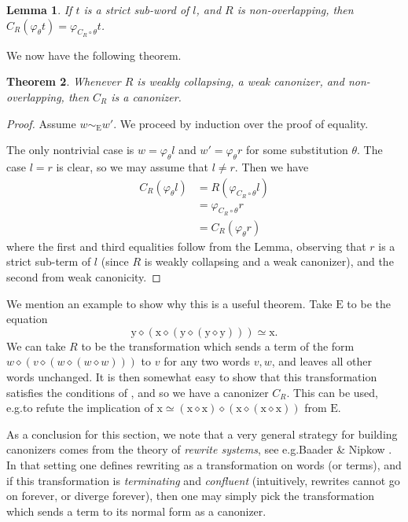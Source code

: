 \documentclass[12pt]{amsart}
\newtheorem{theorem}{Theorem}[section]
\newtheorem{lemma}[theorem]{Lemma}
\theoremstyle{definition}
\newcommand{\x}{\mathrm{x}}
\newcommand{\y}{\mathrm{y}}
\newcommand{\op}{\diamond}
\newcommand{\formaleq}{\simeq}
\newcommand{\E}{\mathrm{E}}
\begin{document}
\begin{lemma}\label{lem:subsubst}
  If $t$ is a strict sub-word of $l$, and $R$ is non-overlapping, then $C_R(\varphi_\theta t) = \varphi_{C_R\circ \theta} t$.
\end{lemma}
We now have the following theorem.
\begin{theorem}\label{thm:canon}
  Whenever $R$ is weakly collapsing, a weak canonizer, and non-overlapping, then $C_R$ is a canonizer.
\end{theorem}
\begin{proof}
  Assume $w\sim_{\E}w'$. We proceed by induction over the proof of equality.

  The only nontrivial case is $w = \varphi_\theta l$ and $w'=\varphi_\theta r$ for some substitution $\theta$.  The case $l=r$ is clear, so we may assume that $l \neq r$.
  Then we have
  \begin{align*}
    C_R(\varphi_\theta l) &= R(\varphi_{C_R\circ\theta}l) \\
                 &= \varphi_{C_R\circ\theta}r\\
                 &= C_R(\varphi_\theta r)
  \end{align*}
  where the first and third equalities follow from the Lemma, observing that $r$ is a strict sub-term of $l$ (since $R$ is weakly collapsing and a weak canonizer), and the second from weak canonicity.
\end{proof}

We mention an example to show why this is a useful theorem. Take $\E$ to be the equation
\[
  \y \op (\x \op (\y \op (\y \op \y)))\formaleq \x.
\]
We can take $R$ to be the transformation which sends a term of the form $w \op (v \op (w \op (w \op w)))$ to $v$ for any two words $v, w$, and leaves all other words unchanged.
It is then somewhat easy to show that this transformation satisfies the conditions of , and so we have a canonizer $C_R$.
This can be used, e.g.\@ to refute the implication of $\x \formaleq (\x \op \x) \op (\x \op (\x \op \x))$ from $\E$.

As a conclusion for this section, we note that a very general strategy for building canonizers comes from the theory of \emph{rewrite systems}, see e.g.\@ Baader \& Nipkow \cite{term-rewriting}.
In that setting one defines rewriting as a transformation on words (or terms), and if this transformation is \emph{terminating} and \emph{confluent} (intuitively, rewrites cannot go on forever, or diverge forever), then one may simply pick the transformation which sends a term to its normal form as a canonizer.
\end{document}
